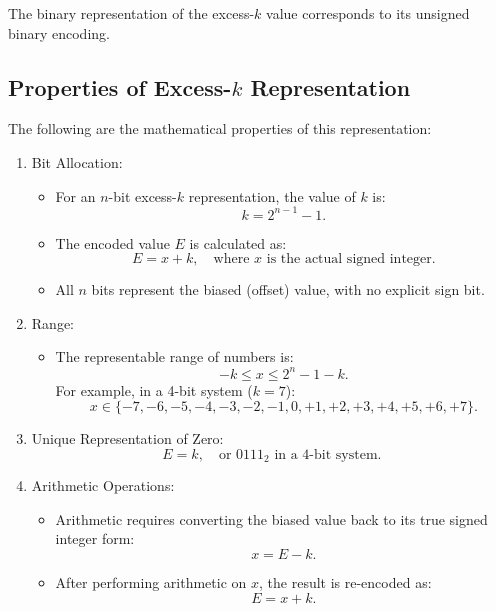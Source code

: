 The binary representation of the excess-\( k \) value corresponds to its unsigned binary encoding.

\subsection{Properties of Excess-\( k \) Representation}

The following are the mathematical properties of this representation:

\begin{enumerate}[left=1cm]
    \item Bit Allocation:
    \begin{itemize}
        \item For an \( n \)-bit excess-\( k \) representation, the value of \( k \) is:
       \[
       k = 2^{n-1} - 1.
       \]
        \item The encoded value \( E \) is calculated as:
        \[
        E = x + k, \quad \text{where } x \text{ is the actual signed integer.}
        \]
        \item All \( n \) bits represent the biased (offset) value, with no explicit sign bit.
    \end{itemize}

    \item Range:
    \begin{itemize}
        \item The representable range of numbers is:
     \[
     -k \leq x \leq 2^n - 1 - k.
     \]
     For example, in a 4-bit system (\( k = 7 \)):
     \[
     x \in \{-7, -6, -5, -4, -3, -2, -1, 0, +1, +2, +3, +4, +5, +6, +7\}.
     \]
     \end{itemize}

    \item Unique Representation of Zero:
     \[
     E = k, \quad \text{or } 0111_2 \text{ in a 4-bit system.}
     \]

    \item Arithmetic Operations:
    \begin{itemize}
        \item Arithmetic requires converting the biased value back to its true signed integer form:
        \[
        x = E - k.
        \]
        \item After performing arithmetic on \( x \), the result is re-encoded as:
        \[
        E = x + k.
        \]
    \end{itemize}


\end{enumerate}
